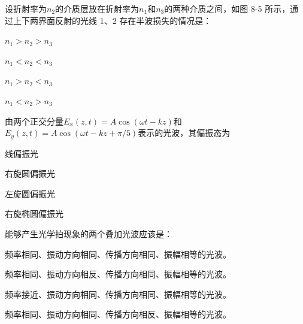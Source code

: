 \documentclass[padl, analysis, notocnum]{ExBook}
\newcommand{\answerarea}[1][3.5cm]{%
  \par\vspace{1mm}%
  \noindent{\color{themeColor!35}\rule{\linewidth}{0.4pt}}\par
  \noindent\begin{minipage}[t][#1][t]{\linewidth}\vspace{0pt}\end{minipage}\par
  \noindent{\color{themeColor!35}\rule{\linewidth}{0.4pt}}\par
}
\begin{document}
\begin{qitems}[startnum=5]
\qitem 设折射率为$n_{2}$的介质层放在折射率为$n_{1}$和$n_{3}$的两种介质之间，如图 8-5 所示，通过上下两界面反射的光线 1、2 存在半波损失的情况是：
\par\noindent\hspace{2em}$n_{1}>n_{2}>n_{3}$
\par\noindent\hspace{2em}$n_{1}<n_{2}<n_{3}$
\par\noindent\hspace{2em}$n_{1}>n_{2}<n_{3}$
\par\noindent\hspace{2em}$n_{1}<n_{2}>n_{3}$
\label{q:178:start}
\answerarea[1.6cm]
\label{q:178:end}
\end{qitems}

\begin{qitems}[startnum=6]
\qitem 由两个正交分量$E_{x}(z,t)=A\cos (\omega t-kz)$和$E_{y}(z,t)=A\cos (\omega t-kz+\pi /5)$表示的光波，其偏振态为
\par\noindent\hspace{2em}线偏振光
\par\noindent\hspace{2em}右旋圆偏振光
\par\noindent\hspace{2em}左旋圆偏振光
\par\noindent\hspace{2em}右旋椭圆偏振光
\label{q:179:start}
\answerarea[4.0cm]
\label{q:179:end}
\end{qitems}

\begin{qitems}[startnum=7]
\qitem 能够产生光学拍现象的两个叠加光波应该是：
\par\noindent\hspace{2em}频率相同、振动方向相同、传播方向相同、振幅相等的光波。
\par\noindent\hspace{2em}频率相同、振动方向相反、传播方向相同、振幅相等的光波。
\par\noindent\hspace{2em}频率接近、振动方向相同、传播方向相同、振幅相等的光波。
\par\noindent\hspace{2em}频率相同、振动方向相同、传播方向相反、振幅相等的光波。
\label{q:180:start}
\answerarea[4.0cm]
\label{q:180:end}
\end{qitems}
\end{document}
